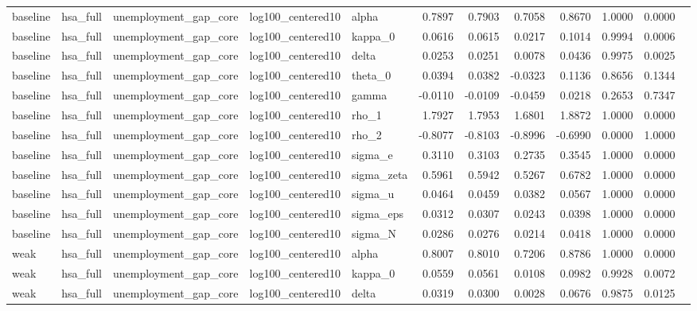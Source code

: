 \begin{tabular}{lllllrrrrrrl}
baseline & hsa\_full & unemployment\_gap\_core & log100\_centered10 & alpha & 0.7897 & 0.7903 & 0.7058 & 0.8670 & 1.0000 & 0.0000 &  \\
baseline & hsa\_full & unemployment\_gap\_core & log100\_centered10 & kappa\_0 & 0.0616 & 0.0615 & 0.0217 & 0.1014 & 0.9994 & 0.0006 &  \\
baseline & hsa\_full & unemployment\_gap\_core & log100\_centered10 & delta & 0.0253 & 0.0251 & 0.0078 & 0.0436 & 0.9975 & 0.0025 &  \\
baseline & hsa\_full & unemployment\_gap\_core & log100\_centered10 & theta\_0 & 0.0394 & 0.0382 & -0.0323 & 0.1136 & 0.8656 & 0.1344 &  \\
baseline & hsa\_full & unemployment\_gap\_core & log100\_centered10 & gamma & -0.0110 & -0.0109 & -0.0459 & 0.0218 & 0.2653 & 0.7347 &  \\
baseline & hsa\_full & unemployment\_gap\_core & log100\_centered10 & rho\_1 & 1.7927 & 1.7953 & 1.6801 & 1.8872 & 1.0000 & 0.0000 &  \\
baseline & hsa\_full & unemployment\_gap\_core & log100\_centered10 & rho\_2 & -0.8077 & -0.8103 & -0.8996 & -0.6990 & 0.0000 & 1.0000 &  \\
baseline & hsa\_full & unemployment\_gap\_core & log100\_centered10 & sigma\_e & 0.3110 & 0.3103 & 0.2735 & 0.3545 & 1.0000 & 0.0000 &  \\
baseline & hsa\_full & unemployment\_gap\_core & log100\_centered10 & sigma\_zeta & 0.5961 & 0.5942 & 0.5267 & 0.6782 & 1.0000 & 0.0000 &  \\
baseline & hsa\_full & unemployment\_gap\_core & log100\_centered10 & sigma\_u & 0.0464 & 0.0459 & 0.0382 & 0.0567 & 1.0000 & 0.0000 &  \\
baseline & hsa\_full & unemployment\_gap\_core & log100\_centered10 & sigma\_eps & 0.0312 & 0.0307 & 0.0243 & 0.0398 & 1.0000 & 0.0000 &  \\
baseline & hsa\_full & unemployment\_gap\_core & log100\_centered10 & sigma\_N & 0.0286 & 0.0276 & 0.0214 & 0.0418 & 1.0000 & 0.0000 &  \\
weak & hsa\_full & unemployment\_gap\_core & log100\_centered10 & alpha & 0.8007 & 0.8010 & 0.7206 & 0.8786 & 1.0000 & 0.0000 &  \\
weak & hsa\_full & unemployment\_gap\_core & log100\_centered10 & kappa\_0 & 0.0559 & 0.0561 & 0.0108 & 0.0982 & 0.9928 & 0.0072 &  \\
weak & hsa\_full & unemployment\_gap\_core & log100\_centered10 & delta & 0.0319 & 0.0300 & 0.0028 & 0.0676 & 0.9875 & 0.0125 &  \\

\end{tabular}
